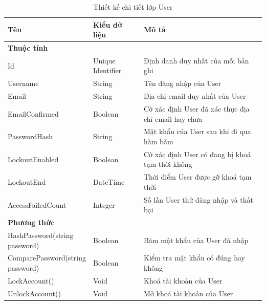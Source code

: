 \documentclass[../DoAn.tex]{subfiles}
\begin{document}
\begin{table}[H]
    \renewcommand{\arraystretch}{1.2}
    \centering{}
    \begin{tabular}{p{0.3\linewidth}p{0.2\linewidth}p{0.5\linewidth}}
        \hline
        \textbf{Tên}                     & \textbf{Kiểu dữ liệu} & \textbf{Mô tả}                                      \\ \hline
        \textbf{Thuộc tính}                                                                                            \\ \hline
        Id                               & Unique Identifier     & Định danh duy nhất của mỗi bản ghi                  \\ \hline
        Username                         & String                & Tên đăng nhập của User                              \\ \hline
        Email                            & String                & Địa chị email duy nhất của User                     \\ \hline
        EmailConfirmed                   & Boolean               & Cờ xác định User đã xác thực địa chỉ email hay chưa \\ \hline
        PasswordHash                     & String                & Mật khẩu của User sau khi đi qua hàm băm            \\ \hline
        LockoutEnabled                   & Boolean               & Cờ xác định User có đang bị khoá tạm thời không     \\ \hline
        LockoutEnd                       & DateTime              & Thời điểm User được gỡ khoá tạm thời                \\ \hline
        AccessFailedCount                & Integer               & Số lần User thử đăng nhập và thất bại               \\ \hline
        \textbf{Phương thức}                                                                                           \\ \hline
        HashPassword(string password)    & Boolean               & Băm mật khẩu của User đã nhập                       \\ \hline
        ComparePassword(string password) & Boolean               & Kiểm tra mật khẩu có đúng hay không                 \\ \hline
        LockAccount()                    & Void                  & Khoá tài khoản của User                             \\ \hline
        UnlockAccount()                  & Void                  & Mở khoá tài khoản của User                          \\ \hline
    \end{tabular}
    \renewcommand{\arraystretch}{1}
    \caption{Thiết kế chi tiết lớp User}
    \label{fig:classdesign_user}
\end{table}
\end{document}
